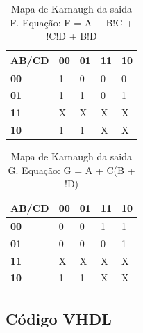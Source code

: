 \documentclass[12pts]{article}
\begin{document}
\begin{table}[h]
\begin{center}
	\begin{tabular}{|l|l|l|l|l|}
		\hline
		\textbf{AB/CD} & \textbf{00} & \textbf{01} & \textbf{11} & \textbf{10}\\
		\hline
		\textbf{00} & 1 & 0 & 0 &0\\
		\hline
		\textbf{01} & 1 & 1 & 0 & 1\\
		\hline
		\textbf{11} & X & X & X & X\\
		\hline
		\textbf{10} & 1 & 1 & X & X\\
		\hline
	\end{tabular}
\end{center}
	\caption{Mapa de Karnaugh da saida F. Equação: F = A + B!C + !C!D + B!D }
	\end{table}
	\singlespacing
	
\begin{table}[h]
\begin{center}
	\begin{tabular}{|l|l|l|l|l|}
		\hline
		\textbf{AB/CD} & \textbf{00} & \textbf{01} & \textbf{11} & \textbf{10}\\
		\hline
		\textbf{00} & 0 & 0 & 1 & 1\\
		\hline
		\textbf{01} & 0 & 0 & 0 & 1\\
		\hline
		\textbf{11} & X & X & X & X\\
		\hline
		\textbf{10} & 1 & 1 & X & X\\
		\hline
	\end{tabular}
\end{center}
	\caption{Mapa de Karnaugh da saida G. Equação: G = A + C(B + !D) }
	\end{table}
	\singlespacing

\clearpage
\subsection{Código VHDL}


\clearpage
\end{document}
